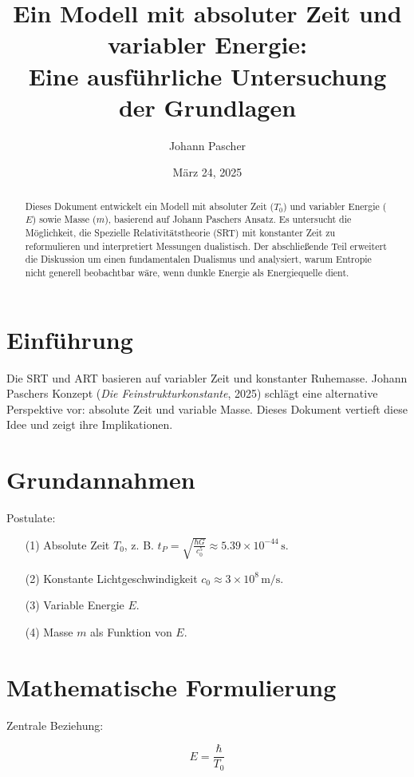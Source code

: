 \documentclass{article}
\title{Ein Modell mit absoluter Zeit und variabler Energie: \\Eine ausführliche Untersuchung der Grundlagen}
\author{Johann Pascher}
\date{März 24, 2025}
\begin{document}
	
	\maketitle
	
	\begin{abstract}
		Dieses Dokument entwickelt ein Modell mit absoluter Zeit (\( T_0 \)) und variabler Energie (\( E \)) sowie Masse (\( m \)), basierend auf Johann Paschers Ansatz. Es untersucht die Möglichkeit, die Spezielle Relativitätstheorie (SRT) mit konstanter Zeit zu reformulieren und interpretiert Messungen dualistisch. Der abschließende Teil erweitert die Diskussion um einen fundamentalen Dualismus und analysiert, warum Entropie nicht generell beobachtbar wäre, wenn dunkle Energie als Energiequelle dient.
	\end{abstract}
	
	\section{Einführung}
	
	Die SRT und ART basieren auf variabler Zeit und konstanter Ruhemasse. Johann Paschers Konzept (\textit{Die Feinstrukturkonstante}, 2025) schlägt eine alternative Perspektive vor: absolute Zeit und variable Masse. Dieses Dokument vertieft diese Idee und zeigt ihre Implikationen.
	
	\section{Grundannahmen}
	
	Postulate:
	\begin{enumerate}
		\item[(1)] Absolute Zeit \( T_0 \), z. B. \( t_P = \sqrt{\frac{\hbar G}{c_0^5}} \approx 5.39 \times 10^{-44} \, \text{s} \).
		\item[(2)] Konstante Lichtgeschwindigkeit \( c_0 \approx 3 \times 10^8 \, \text{m/s} \).
		\item[(3)] Variable Energie \( E \).
		\item[(4)] Masse \( m \) als Funktion von \( E \).
	\end{enumerate}
	
	\section{Mathematische Formulierung}
	
	Zentrale Beziehung:
	
	\[
	E = \frac{\hbar}{T_0}
	\]
	
\end{document}
